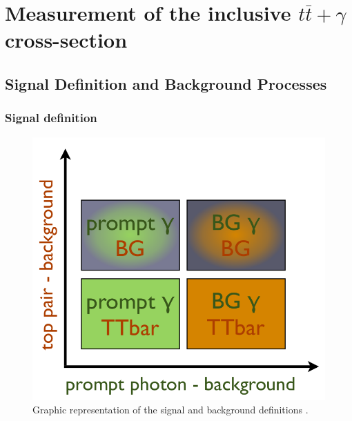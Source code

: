 \chapter{Measurement of the inclusive $t\bar{t}+\gamma$ cross-section}\label{chap-crosssection}

\section{Signal Definition and Background Processes}

\subsection{Signal definition}

\begin{figure} 
\begin{center}
\includegraphics[scale=0.33]{Figures/SignalPhotonPlot.png}
\end{center}
\caption{Graphic representation of the signal and background definitions \cite{MishaThesis}.}
\label{fig-signalphotonplot}
\end{figure}


